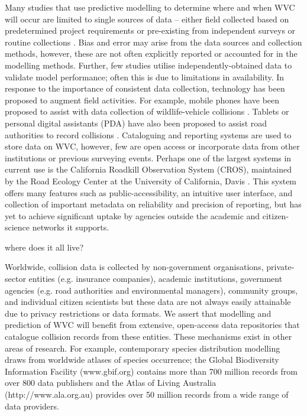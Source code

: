 Many studies that use predictive modelling to determine where and when WVC will occur are limited to single sources of data -- either field collected based on predetermined project requirements \citep[e.g.][]{lang09,roge09} or pre-existing from independent surveys or routine collections \citep[e.g.][]{hoth12,malo04}. Bias and error may arise from the data sources and collection methods, however, these are not often explicitly reported or accounted for in the modelling methods. Further, few studies utilise independently-obtained data to validate model performance; often this is due to limitations in availability. In response to the importance of consistent data collection, technology has been proposed to augment field activities. For example, mobile phones have been proposed to assist with data collection of wildlife-vehicle collisions \citep{aane09,olso14}. Tablets or personal digital assistants (PDA) have also been proposed to assist road authorities to record collisions \citep{amen07}. Cataloguing and reporting systems are used to store data on WVC, however, few are open access or incorporate data from other institutions or previous surveying events. Perhaps one of the largest systems in current use is the California Roadkill Observation System (CROS), maintained by the Road Ecology Center at the University of California, Davis \citep{shil15b}. This system offers many features such as public-accessibility, an intuitive user interface, and collection of important metadata on reliability and precision of reporting, but has yet to achieve significant uptake by agencies outside the academic and citizen-science networks it supports.

where does it all live?

Worldwide, collision data is collected by non-government organisations, private-sector entities (e.g. insurance companies), academic institutions, government agencies (e.g. road authorities and environmental managers), community groups, and individual citizen scientists but these data are not always easily attainable due to privacy restrictions or data formats. We assert that modelling and prediction of WVC will benefit from extensive, open-access data repositories that catalogue collision records from these entities. These mechanisms exist in other areas of research. For example, contemporary species distribution modelling draws from worldwide atlases of species occurrence; the Global Biodiversity Information Facility (www.gbif.org) contains more than 700 million records from over 800 data publishers and the Atlas of Living Australia (http://www.ala.org.au) provides over 50 million records from a wide range of data providers.

